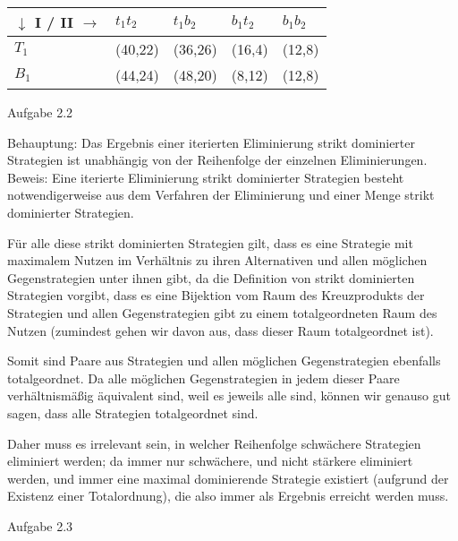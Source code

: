 \documentclass{scrartcl}
\begin{document}
\begin{tabularx}{1\textwidth} {|X|X|X|X|X|}
\hline
$\downarrow$ I / II $\rightarrow$	& $t_1t_2$		& $t_1b_2$		& $b_1t_2$		& $b_1b_2$	\\
\hline
$T_1$								& (40,22)		& (36,26)		& (16,4)		& (12,8)		\\
\hline
$B_1$								& (44,24)		& (48,20)		& (8,12)		& (12,8)		\\
\hline
\end{tabularx}
\clearpage

\begin{Large}
Aufgabe 2.2\\[0.0cm]
\end{Large}

Behauptung: Das Ergebnis einer iterierten Eliminierung strikt dominierter Strategien ist unabhängig von 
der Reihenfolge der einzelnen Eliminierungen. \\

Beweis:  Eine iterierte Eliminierung strikt dominierter Strategien besteht notwendigerweise aus dem
Verfahren der Eliminierung und einer Menge strikt dominierter Strategien. 

Für alle diese strikt dominierten Strategien gilt, dass es eine Strategie mit maximalem Nutzen im Verhältnis 
zu ihren Alternativen und allen möglichen Gegenstrategien unter ihnen gibt, da die Definition von strikt
dominierten Strategien vorgibt, dass es eine Bijektion vom Raum des Kreuzprodukts der Strategien und allen 
Gegenstrategien gibt zu einem totalgeordneten Raum des Nutzen (zumindest gehen wir davon aus, dass dieser 
Raum totalgeordnet ist). 

Somit sind Paare aus Strategien und allen möglichen Gegenstrategien ebenfalls totalgeordnet. 
Da alle möglichen Gegenstrategien in jedem dieser Paare verhältnismäßig äquivalent sind, weil es jeweils 
alle sind, können wir genauso gut sagen, dass alle Strategien totalgeordnet sind. 

Daher muss es irrelevant sein, in welcher Reihenfolge schwächere Strategien eliminiert werden; da immer nur
 schwächere, und nicht stärkere eliminiert werden, und immer eine maximal dominierende Strategie existiert 
(aufgrund der Existenz einer Totalordnung), die also immer als Ergebnis erreicht werden muss. 

\clearpage

\begin{Large}
Aufgabe 2.3\\[0.0cm]
\end{Large}
\end{document}
